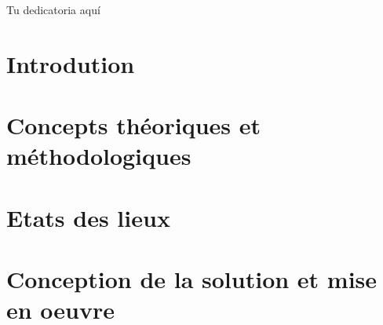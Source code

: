 \documentclass[titlepage,openright,twoside,a4paper,draft,12pt,french]{book}
\author{Nombre del Alumno}{Grado en Ingeniería Informática - Especialidad}{D.~}{12345678A}
\begin{document}
\makeTitlePage

\pagestyle{empty}
\begin{dedication}
Tu dedicatoria aquí
\end{dedication}
\pagestyle{trinidadPhD}




\tableofcontents
\listoffigures
\listoftables
\listoftodos
\newpage



\part{Introdution}


\part{Concepts théoriques et méthodologiques}



\part{Etats des lieux}



\part{Conception de la solution et mise en oeuvre}






\appendix




\printglossaries
\newpage



\end{document}
